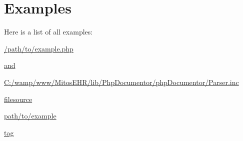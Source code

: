 \section{\-Examples}
\-Here is a list of all examples\-:\begin{DoxyCompactItemize}
\item 
\hyperlink{_2path_2to_2example_8php-example}{/path/to/example.\-php}
\item 
\hyperlink{and-example}{and}
\item 
\hyperlink{_c_1_2wamp_2www_2_mitos_e_h_r_2lib_2_php_documentor_2php_documentor_2_parser_8inc-example}{\-C\-:/wamp/www/\-Mitos\-E\-H\-R/lib/\-Php\-Documentor/php\-Documentor/\-Parser.\-inc}
\item 
\hyperlink{filesource-example}{filesource}
\item 
\hyperlink{path_2to_2example-example}{path/to/example}
\item 
\hyperlink{tag-example}{tag}
\end{DoxyCompactItemize}
